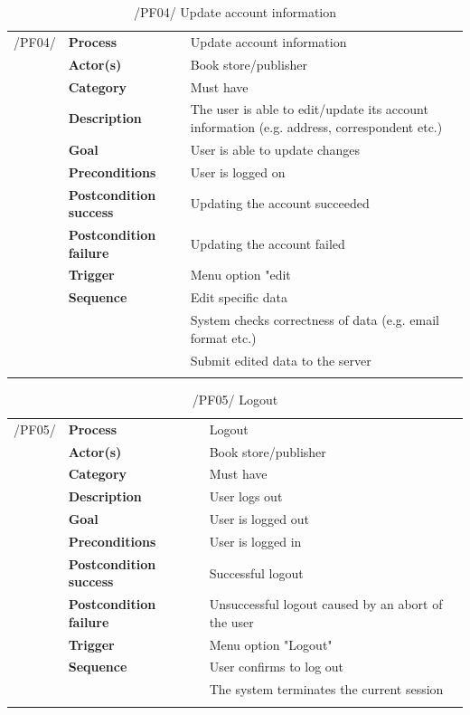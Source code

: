 \documentclass[11pt,a4paper,oneside,svgnames]{report}
\begin{document}
\begin{table}[H]
\centering
\begin{tabular}{p{1.5cm}p{3cm}p{8cm}}
\cellcolor{white}/PF04/	& \textbf{Process} & Update account information\\
\cellcolor{white}		& \textbf{Actor(s)} & Book store/publisher\\
\cellcolor{white}		& \textbf{Category} & Must have\\
\cellcolor{white}		& \textbf{Description}	 & The user is able to edit/update its account information (e.g. address, correspondent etc.)\\
\cellcolor{white}		& \textbf{Goal} & User is able to update changes\\
\cellcolor{white}		& \textbf{Preconditions} & User is logged on\\
\cellcolor{white}		& \textbf{Postcondition success} & Updating the account succeeded\\
\cellcolor{white}		& \textbf{Postcondition failure} & Updating the account failed\\
\cellcolor{white}		& \textbf{Trigger} & Menu option "edit\\
\cellcolor{white}		& \textbf{Sequence} & Edit specific data\\
\cellcolor{white}		& & System checks correctness of data (e.g. email format etc.)\\
\cellcolor{white}		& & Submit edited data to the server\\
\cellcolor{white}\hfill \\
\end{tabular}
\caption{/PF04/ Update account information}
\label{tab:pf04}
\end{table}

\begin{table}[H]
\centering
\begin{tabular}{p{1.5cm}p{3cm}p{8cm}}
\cellcolor{white}/PF05/	& \textbf{Process} & Logout\\
\cellcolor{white}		& \textbf{Actor(s)} & Book store/publisher\\
\cellcolor{white}		& \textbf{Category} & Must have\\
\cellcolor{white}		& \textbf{Description}	 & User logs out\\
\cellcolor{white}		& \textbf{Goal} & User is logged out\\
\cellcolor{white}		& \textbf{Preconditions} & User is logged in\\
\cellcolor{white}		& \textbf{Postcondition success} & Successful logout\\
\cellcolor{white}		& \textbf{Postcondition failure} & Unsuccessful logout caused by an abort of the user\\
\cellcolor{white}		& \textbf{Trigger} & Menu option "Logout"\\
\cellcolor{white}		& \textbf{Sequence} & User confirms to log out\\
\cellcolor{white}		& & The system terminates the current session\\
\cellcolor{white}\hfill \\
\end{tabular}
\caption{/PF05/ Logout}
\label{tab:pf05}
\end{table}
\end{document}
